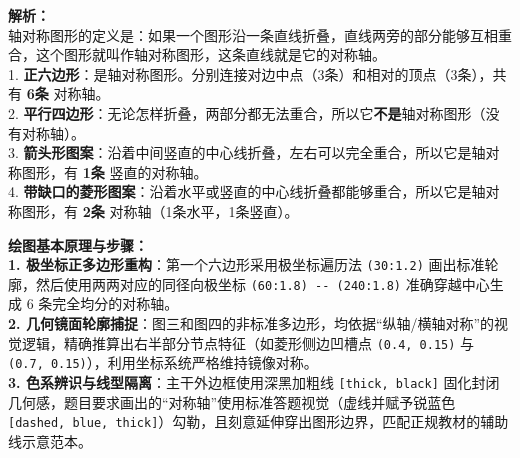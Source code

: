 \vspace{0.8cm}

{\small\color{gray}
\textbf{解析：}\\
轴对称图形的定义是：如果一个图形沿一条直线折叠，直线两旁的部分能够互相重合，这个图形就叫作轴对称图形，这条直线就是它的对称轴。\\
1. \textbf{正六边形}：是轴对称图形。分别连接对边中点（3条）和相对的顶点（3条），共有 \textbf{6条} 对称轴。\\
2. \textbf{平行四边形}：无论怎样折叠，两部分都无法重合，所以它\textbf{不是}轴对称图形（没有对称轴）。\\
3. \textbf{箭头形图案}：沿着中间竖直的中心线折叠，左右可以完全重合，所以它是轴对称图形，有 \textbf{1条} 竖直的对称轴。\\
4. \textbf{带缺口的菱形图案}：沿着水平或竖直的中心线折叠都能够重合，所以它是轴对称图形，有 \textbf{2条} 对称轴（1条水平，1条竖直）。
}

\vspace{0.6cm}

{\small\color{blue!70!black}
\textbf{绘图基本原理与步骤：}\\
\textbf{1. 极坐标正多边形重构}：第一个六边形采用极坐标遍历法 \texttt{(30:1.2)} 画出标准轮廓，然后使用两两对应的同径向极坐标 \texttt{(60:1.8) -{}- (240:1.8)} 准确穿越中心生成 6 条完全均分的对称轴。\\
\textbf{2. 几何镜面轮廓捕捉}：图三和图四的非标准多边形，均依据“纵轴/横轴对称”的视觉逻辑，精确推算出右半部分节点特征（如菱形侧边凹槽点 \texttt{(0.4, 0.15)} 与 \texttt{(0.7, 0.15)}），利用坐标系统严格维持镜像对称。\\
\textbf{3. 色系辨识与线型隔离}：主干外边框使用深黑加粗线 \texttt{[thick, black]} 固化封闭几何感，题目要求画出的“对称轴”使用标准答题视觉（虚线并赋予锐蓝色 \texttt{[dashed, blue, thick]}）勾勒，且刻意延伸穿出图形边界，匹配正规教材的辅助线示意范本。
}
